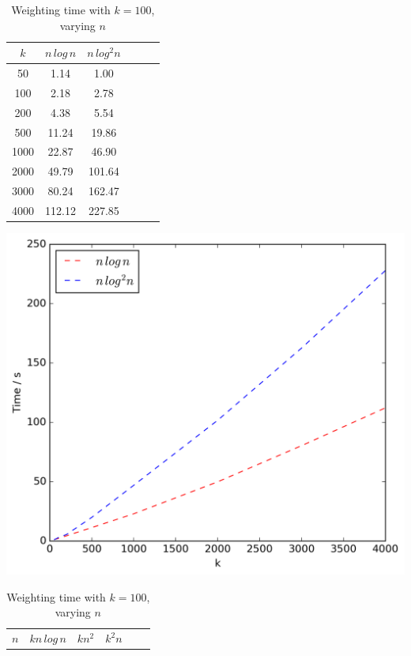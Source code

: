 \documentclass{article}
\begin{document}
\begin{table}[!ht]
\begin{minipage}{0.48\textwidth}
            \centering
            \caption{\texttt{Filter\_Clusters} time with $n = 1000$, varying $k$}
            \label{tab:filterk2}
            \begin{tabular}{c||ccccc}
                $k$ & $n\,log\,n$ & $n\,log^2n$\\
                \hline\hline
                50 & 1.14 & 1.00\\
                100 & 2.18 & 2.78\\
                200 & 4.38 & 5.54\\
                500 & 11.24 & 19.86\\
                1000 & 22.87 & 46.90\\
                2000 & 49.79 & 101.64\\
                3000 & 80.24 & 162.47\\
                4000 & 112.12 & 227.85\\
            \end{tabular}
            \includegraphics[scale=0.4]{varyingk2_filter}
            \vspace{0.5cm}
        \end{minipage}
        \begin{minipage}{0.48\textwidth}
            \centering
            \caption{Weighting time with $k = 100$, varying $n$}
            \label{tab:weightn2}
            \begin{tabular}{c||ccccc}
                $n$ & $kn\,log\,n$ & $kn^2$ & $k^2n$\\

\end{tabular}
\end{minipage}
\end{table}
\end{document}
